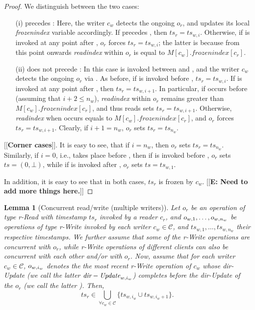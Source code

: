 \documentclass[oribibl]{llncs}
\newtheorem{lemma}[theorem]{Lemma}
\theoremstyle{definition-boldhead}
\newcommand{\var}[1]{\textit{#1}}
\newcommand{\op}[1]{\textsl{#1}}
\newcommand{\clientset}{\ensuremath{\mathcal{C}}\xspace}
\newcommand{\dir}{\var{dir}\xspace}
\providecommand{\note}[1]{}
\renewcommand{\note}[1]{[[\textsf{\bf #1}]]}
\begin{document}
\begin{proof}
We distinguish between the two cases:
\begin{itemize}
\item[(i)] \updaterd{} precedes :
Here, the writer $c_w$ detects the ongoing $o_r$, and updates its local
\var{frozenindex} variable accordingly. If \scanrd{} precedes
, then $\var{ts}_r = \var{ts}_{w,i}$. Otherwise, if
\scanrd{} is invoked at any point after , $o_r$
forces $\var{ts}_r = \var{ts}_{w,i}$; the latter is because from this point onwards
\var{readindex} within $o_r$ is equal to $M[c_w].\var{frozenindex}[c_r]$.
\item[(ii)] \updaterd{} does not precede :
In this case \updaterd{} is invoked between  and ,
and the writer $c_w$ detects the ongoing $o_r$ via . As before,
if \scanrd is invoked before , $\var{ts}_r = \var{ts}_{w,i}$.
If \scanrd{} is invoked at any point after , then
$\var{ts}_r = \var{ts}_{w,i+1}$. In particular, if \scanrd  occurs before
 (assuming that $i+2 \leq n_w$), \var{readindex} within
$o_r$ remains greater than $M[c_w].\var{frozenindex}[c_r]$, and thus reads
sets $\var{ts}_r = \var{ts}_{w,i+1}$. Otherwise, \var{readindex} when \scanrd occurs
equals to $M[c_w].\var{frozenindex}[c_r]$, and $o_r$ forces
$\var{ts}_r = \var{ts}_{w,i+1}$. Clearly, if $i+1 = n_w$, $o_r$ sets $\var{ts}_r = \var{ts}_{n_w}$.
\end{itemize}
\note{Corner cases}. It is easy to see, that if $i = n_w$, then $o_r$ sets
$\var{ts}_r = \var{ts}_{n_w}$. Similarly, if $i = 0$, i.e., \updaterd{} takes place before
, then if \scanrd is invoked before , $o_r$ sets
$ts = (0,\bot)$, while if \scanrd is invoked after , $o_r$ sets
$ts = \var{ts}_{w, 1}$.

In addition, it is easy to see that in both cases, $\var{ts}_r$ is frozen by
$c_w$. \note{E: Need to add more things here.}
\end{proof}


\begin{lemma}[Concurrent read/write (multiple writers)]\label{lem:concmwr}
Let $o_r$ be an operation of type \var{r}-\op{Read} with timestamp $\var{ts}_r$
invoked by a reader $c_r$, and $o_{w,1}, \ldots, o_{w,n_{w}}$ be
operations of type \var{r}-\op{Write} invoked by each
writer $c_w \in \clientset$, and $\var{ts}_{w,1}, \ldots, \var{ts}_{w,n_w}$ their
respective timestamps.
We further assume that some of the \var{r}-\op{Write} operations are
concurrent with $o_r$, while \var{r}-\op{Write} operations of different
clients can also be concurrent with each other and/or with $o_r$.
Now, assume that for each writer $c_w \in \clientset$,
$o_{w,i_w}$ denotes the the most recent \var{r}-\op{Write} operation of
$c_w$ whose \dir-\op{Update} (we call the latter $\updatewi{i_w}$) completes
before the \dir-\op{Update} of the $o_r$ (we call the latter \updaterd).
Then, \[
\var{ts}_r \in \bigcup\limits_{\forall c_w \in\clientset} \{\var{ts}_{w,i_w} \cup \var{ts}_{w,i_w+1}\}.\]
\end{lemma}
\end{document}
